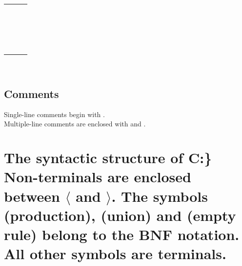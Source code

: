 \documentclass[a4paper,11pt]{article}
\begin{document}
{\begin{tabular}{lll}
{\symb{;}} &{\symb{\{}} &{\symb{\}}} \\
{\symb{(}} &{\symb{)}} &{\symb{{$=$}}} \\
{\symb{!}} &{\symb{{$+$}{$+$}}} &{\symb{{$-$}{$-$}}} \\
{\symb{\~{}}} &{\symb{*}} &{\symb{**}} \\
{\symb{/}} &{\symb{$\backslash$}} &{\symb{\%}} \\
{\symb{{$+$}}} &{\symb{{$-$}}} &{\symb{{$<$}{$<$}}} \\
{\symb{{$>$}{$>$}}} &{\symb{{$<$}}} &{\symb{{$>$}}} \\
{\symb{{$<$}{$=$}}} &{\symb{{$>$}{$=$}}} &{\symb{{$=$}{$=$}}} \\
{\symb{!{$=$}}} &{\symb{\&}} &{\symb{{$|$}}} \\
{\symb{\^}} &{\symb{\&\&}} &{\symb{{$|$}{$|$}}} \\
{\symb{\^\^}} &{\symb{{$-$}{$>$}}} &{\symb{{$<$}{$-$}}} \\
{\symb{[}} &{\symb{]}} &{\symb{.}} \\
{\symb{,}} &{\symb{?}} &{\symb{:}} \\
{\symb{{$+$}{$=$}}} &{\symb{{$-$}{$=$}}} &{\symb{*{$=$}}} \\
{\symb{/{$=$}}} &{\symb{\%{$=$}}} &{\symb{\&{$=$}}} \\
{\symb{{$|$}{$=$}}} &{\symb{\^{$=$}}} &{\symb{{$<$}{$<$}{$=$}}} \\
{\symb{{$>$}{$>$}{$=$}}} & & \\
\end{tabular}\\

\subsection*{Comments}
Single-line comments begin with {\symb{//}}. \\Multiple-line comments are  enclosed with {\symb{/*}} and {\symb{*/}}.

\section*{The syntactic structure of C:\Users\Semi\Documents{}\}
Non-terminals are enclosed between $\langle$ and $\rangle$. 
The symbols  {\arrow}  (production),  {\delimit}  (union) 
and {\emptyP} (empty rule) belong to the BNF notation. 
All other symbols are terminals.\\

}}
\end{document}
